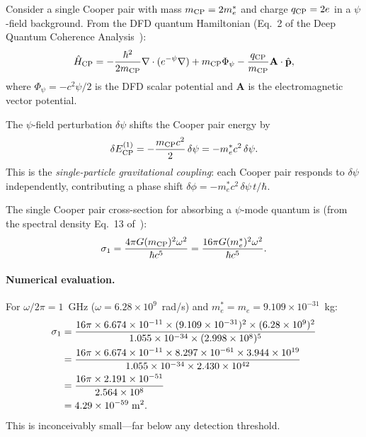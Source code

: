 \documentclass[12pt,aps,prd,twocolumn,superscriptaddress,nofootinbib]{revtex4-2}
\newcommand{\psifield}{\psi}
\newcommand{\ee}[1]{\times 10^{#1}}
\begin{document}
Consider a single Cooper pair with mass $m_{\rm CP} = 2m_e^*$ and charge
$q_{\rm CP} = 2e$ in a $\psi$-field background. From the DFD quantum
Hamiltonian (Eq.~2 of the Deep Quantum Coherence Analysis~\cite{Alcock2025DeepQC}):
\begin{equation}\label{eq:H-single-CP}
\hat{H}_{\rm CP} = -\frac{\hbar^2}{2m_{\rm CP}}
\nabla\cdot(e^{-\psifield}\nabla)
+ m_{\rm CP}\Phi_\psi
- \frac{q_{\rm CP}}{m_{\rm CP}}\mathbf{A}\cdot\hat{\mathbf{p}},
\end{equation}
where $\Phi_\psi = -c^2\psifield/2$ is the DFD scalar potential and
$\mathbf{A}$ is the electromagnetic vector potential.

The $\psi$-field perturbation $\delta\psifield$ shifts the Cooper pair
energy by
\begin{equation}\label{eq:dE-single}
\delta E_{\rm CP}^{(1)} = -\frac{m_{\rm CP}c^2}{2}\,\delta\psifield
= -m_e^* c^2\,\delta\psifield.
\end{equation}
This is the \emph{single-particle gravitational coupling}: each Cooper
pair responds to $\delta\psifield$ independently, contributing a phase
shift $\delta\phi = -m_e^* c^2\,\delta\psifield\,t/\hbar$.

The single Cooper pair cross-section for absorbing a $\psi$-mode
quantum is (from the spectral density Eq.~13 of~\cite{Alcock2025DeepQC}):
\begin{equation}\label{eq:sigma-single}
\sigma_1 = \frac{4\pi G(m_{\rm CP})^2 \omega^2}{\hbar c^5}
= \frac{16\pi G(m_e^*)^2 \omega^2}{\hbar c^5}.
\end{equation}

\paragraph{Numerical evaluation.}
For $\omega/2\pi = 1$~GHz ($\omega = 6.28\ee{9}$~rad/s) and
$m_e^* = m_e = 9.109\ee{-31}$~kg:
\begin{align}
\sigma_1 &= \frac{16\pi \times 6.674\ee{-11} \times (9.109\ee{-31})^2
\times (6.28\ee{9})^2}{1.055\ee{-34} \times (2.998\ee{8})^5}
\notag \\
&= \frac{16\pi \times 6.674\ee{-11} \times 8.297\ee{-61}
\times 3.944\ee{19}}{1.055\ee{-34} \times 2.430\ee{42}}
\notag \\
&= \frac{16\pi \times 2.191\ee{-51}}{2.564\ee{8}}
\notag \\
&= 4.29\ee{-59}\;\si{m^2}.
\label{eq:sigma1-number}
\end{align}
This is inconceivably small---far below any detection threshold.
\end{document}
